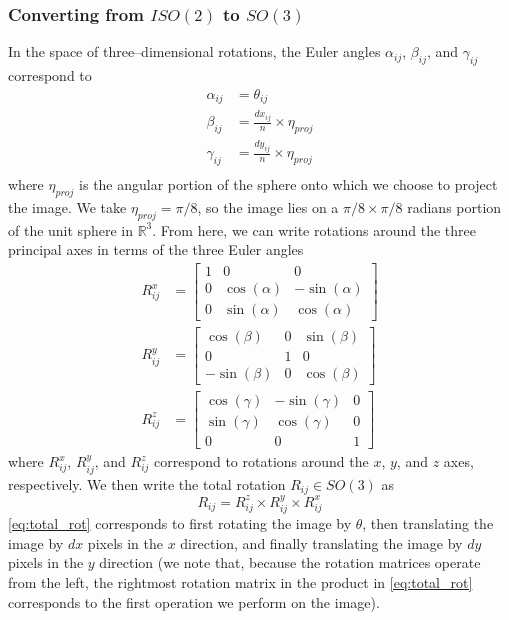 \documentclass[11pt]{article}
\begin{document}
\subsubsection{Converting from $ISO(2)$ to $SO(3)$}

In the space of three--dimensional rotations, the Euler angles $\alpha_{ij}$, $\beta_{ij}$, and $\gamma_{ij}$ correspond to
\begin{equation} \label{eq:angle_relations}
\begin{aligned}
	\alpha_{ij} &= \theta_{ij} \\
	\beta_{ij} &= \frac{dx_{ij}}{n} \times \eta_{proj} \\
	\gamma_{ij} &= \frac{dy_{ij}}{n} \times \eta_{proj} \\
\end{aligned}
\end{equation}
where $\eta_{proj}$ is the angular portion of the sphere onto which we choose to project the image.
%
We take $\eta_{proj} =  \pi/8$, so the image lies on a $\pi/8 \times \pi/8$ radians portion of the unit sphere in $\mathbb{R}^3$.
%
From here, we can write rotations around the three principal axes in terms of the three Euler angles
\begin{equation}
\begin{aligned}
	R^x_{ij} &= \begin{bmatrix}
	1 & 0 & 0 \\
    0 & \cos(\alpha) & -\sin(\alpha) \\
    0 & \sin(\alpha) & \cos(\alpha)
	\end{bmatrix} \\
	R^y_{ij} &= \begin{bmatrix}
	\cos(\beta) & 0 & \sin(\beta) \\
    0 & 1 & 0 \\
    -\sin(\beta) & 0 & \cos(\beta)
    \end{bmatrix} \\
	R^z_{ij} &= \begin{bmatrix} 
	\cos(\gamma) & -\sin(\gamma) & 0 \\
    \sin(\gamma) & \cos(\gamma) & 0 \\
    0 & 0 & 1 
    \end{bmatrix}
\end{aligned}
\end{equation}
where $R^x_{ij}$, $R^y_{ij}$, and $R^z_{ij}$ correspond to rotations around the $x$, $y$, and $z$ axes, respectively.
%
We then write the total rotation $R_{ij} \in SO(3)$ as 
\begin{equation} \label{eq:total_rot}
	R_{ij}	 = R^z_{ij} \times R^y_{ij} \times R^x_{ij}
\end{equation}
%
\eqref{eq:total_rot} corresponds to first rotating the image by $\theta$, then translating the image by $dx$ pixels in the $x$ direction, and finally translating the image by $dy$ pixels in the $y$ direction (we note that, because the rotation matrices operate from the left, the rightmost rotation matrix in the product in \eqref{eq:total_rot} corresponds to the first operation we perform on the image).
\end{document}
